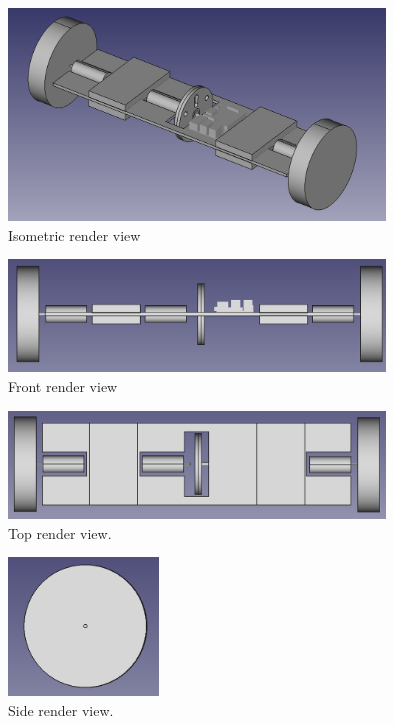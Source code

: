 \begin{figure}
	\centering
	\includegraphics[width=10cm]{img/isometric_view.png}
	\caption{Isometric render view}
	\label{fig:Isometric render view}
\end{figure}
\begin{figure}
	\centering
	\includegraphics[width=10cm]{img/front_view.png}
	\caption{Front render view}
	\label{fig:Front render view}
\end{figure}
\begin{figure}
	\centering
	\includegraphics[width=10cm]{img/top_view.png}
	\caption{Top render view.}
	\label{fig:Top render view}
\end{figure}
\begin{figure}
	\centering
	\includegraphics[width=4cm]{img/side_view.png}
	\caption{Side render view.}
	\label{fig:Side render view}
\end{figure}

